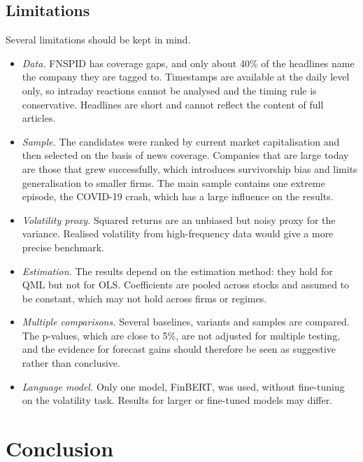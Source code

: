 \documentclass[12pt,a4paper]{article}
\begin{document}
\subsection{Limitations}\label{sec:disc-limitations}
Several limitations should be kept in mind.
\begin{itemize}
  \item \emph{Data.} FNSPID has coverage gaps, and only about 40\% of the headlines name the company they are tagged to. Timestamps are available at the daily level only, so intraday reactions cannot be analysed and the timing rule is conservative. Headlines are short and cannot reflect the content of full articles.
  \item \emph{Sample.} The candidates were ranked by current market capitalisation and then selected on the basis of news coverage. Companies that are large today are those that grew successfully, which introduces survivorship bias and limits generalisation to smaller firms. The main sample contains one extreme episode, the COVID-19 crash, which has a large influence on the results.
  \item \emph{Volatility proxy.} Squared returns are an unbiased but noisy proxy for the variance. Realised volatility from high-frequency data would give a more precise benchmark.
  \item \emph{Estimation.} The results depend on the estimation method: they hold for QML but not for OLS. Coefficients are pooled across stocks and assumed to be constant, which may not hold across firms or regimes.
  \item \emph{Multiple comparisons.} Several baselines, variants and samples are compared. The p-values, which are close to 5\%, are not adjusted for multiple testing, and the evidence for forecast gains should therefore be seen as suggestive rather than conclusive.
  \item \emph{Language model.} Only one model, FinBERT, was used, without fine-tuning on the volatility task. Results for larger or fine-tuned models may differ.
\end{itemize}

\section{Conclusion}\label{sec:conclusion}
\end{document}
